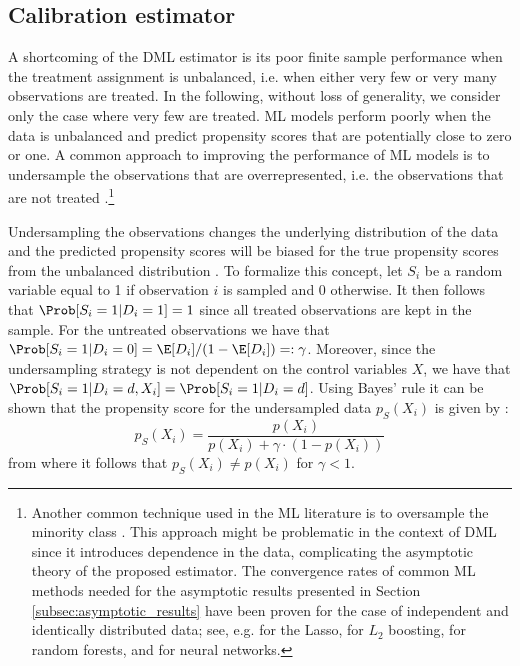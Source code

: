 \subsection{Calibration estimator}
A shortcoming of the DML estimator is its poor finite sample performance when the treatment assignment is unbalanced, i.e. when either very few or very many observations are treated. In the following, without loss of generality, we consider only the case where very few are treated. ML models perform poorly when the data is unbalanced \citep{Japkowicz2002} and predict propensity scores that are potentially close to zero or one. A common approach to improving the performance of ML models is to undersample the observations that are overrepresented, i.e. the observations that are not treated \citep{He2009}.\footnote{Another common technique used in the ML literature is to oversample the minority class \citep{Japkowicz2002}. This approach might be problematic in the context of DML since it introduces dependence in the data, complicating the asymptotic theory of the proposed estimator. The convergence rates of common ML methods needed for the asymptotic results presented in Section \ref{subsec:asymptotic_results} have been proven for the case of independent and identically distributed data; see, e.g. \cite{Belloni2013} for the Lasso, \cite{Luo2016} for $L_2$ boosting, \cite{Wager2016} for random forests, and \cite{Chen1999} for neural networks.}

Undersampling the observations changes the underlying distribution of the data and the predicted propensity scores will be biased for the true propensity scores from the unbalanced distribution \citep{Pozzolo2015}. To formalize this concept, let $S_i$ be a random variable equal to 1 if observation $i$ is sampled and 0 otherwise. It then follows that $\Prob[S_i=1|D_i=1]=1$ since all treated observations are kept in the sample. For the untreated observations we have that $\Prob[S_i=1|D_i=0] = \E[D_i]/(1-\E[D_i]) =: \gamma$. Moreover, since the undersampling strategy is not dependent on the control variables $X$, we have that $\Prob[S_i=1\vert D_i=d, X_i] = \Prob[S_i=1\vert D_i=d]$. Using Bayes' rule it can be shown that the propensity score for the undersampled data $p_S(X_i)$ is given by \citep{Pozzolo2015}:
\begin{equation}\label{eq:undersampled_propensity}
    p_S(X_i) = \frac{p(X_i)}{p(X_i) + \gamma \cdot \left(1-p(X_i)\right)}
\end{equation}
from where it follows that $p_S(X_i)\neq p(X_i)$ for $\gamma < 1$.

